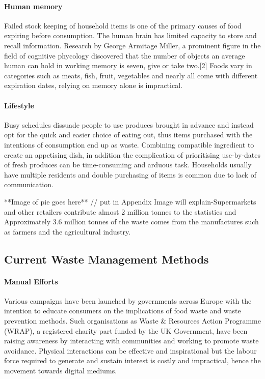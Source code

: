 \documentclass[a4paper, 11pt]{article}
\begin{document}
\paragraph{Human memory} Failed stock keeping of household items is one of the primary causes of food expiring before consumption. The human brain has limited capacity to store and recall information. Research by George Armitage Miller, a prominent figure in the field of cognitive phycology discovered that the number of objects an average human can hold in working memory is seven, give or take two.[2] Foods vary in categories such as meats, fish, fruit, vegetables and nearly all come with different expiration dates, relying on memory alone is impractical. 

\paragraph{Lifestyle} Busy schedules dissuade people to use produces brought in advance and instead opt for the quick and easier choice of eating out, thus items purchased with the intentions of consumption end up as waste. Combining compatible ingredient to create an appetising dish, in addition the complication of prioritising use-by-dates of fresh produces can be time-consuming and arduous task. Households usually have multiple residents and double purchasing of items is common due to lack of communication. 

\vspace{\baselineskip}

**Image of pie goes here** // put in Appendix
Image will explain-Supermarkets and other retailers contribute almost 2 million tonnes to the statistics and Approximately 3.6 million tonnes of the waste comes from the manufactures such as farmers and the agricultural industry. 

\vspace{\baselineskip}
\vspace{\baselineskip}
\vspace{\baselineskip}

\subsection{Current Waste Management Methods}

\paragraph{Manual Efforts}
Various campaigns have been launched by governments across Europe with the intention to educate consumers on the implications of food waste and waste prevention methods. Such organisations as Waste \& Resources Action Programme (WRAP), a registered charity part funded by the UK Government, have been raising awareness by interacting with communities and working to promote waste avoidance. Physical interactions can be effective and inspirational but the labour force required to generate and sustain interest is costly and impractical, hence the movement towards digital mediums.
\end{document}

